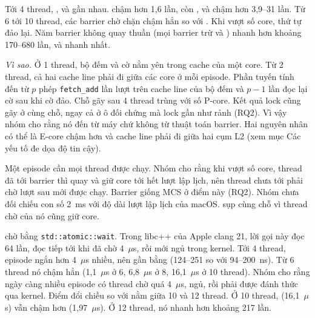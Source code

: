 Tới 4 thread, ,  và  gần nhau. 
chậm hơn  1,6 lần, còn ,  và  chậm
hơn 3,9--31 lần. Từ 6 tới 10 thread, các barrier chờ chặn chậm hẳn so với . Khi vượt số
core, thứ tự đảo lại. Năm barrier không quay thuần (mọi barrier trừ  và )
nhanh hơn  khoảng 170--680 lần, và  nhanh nhất.

\emph{Vì sao.} Ở 1 thread, bộ đếm và cờ nằm yên trong cache của một core. Từ 2 thread, cả hai cache
line phải đi giữa các core ở mỗi episode. Phần tuyến tính đến từ $p$ phép \texttt{fetch\_add} lần lượt
trên cache line của bộ đếm và $p-1$ lần đọc lại cờ sau khi cờ đảo. Chỗ gãy sau 4 thread trùng với số
P-core. Kết quả lock cũng gãy ở cùng chỗ, ngay cả ở ô đối chứng mà lock gần như rảnh (RQ2). Vì vậy nhóm
cho rằng nó đến từ máy chứ không từ thuật toán barrier. Hai nguyên nhân có thể là E-core chậm hơn và cache
line phải đi giữa hai cụm L2 (xem mục Các yếu tố đe dọa độ tin cậy).

Một episode cần mọi thread được chạy. Nhóm cho rằng khi vượt số core, thread đã tới barrier thì quay và
giữ core tới hết lượt lập lịch, nên thread chưa tới phải chờ lượt sau mới được chạy. Barrier giống MCS ở
điểm này (RQ2). Nhóm chưa đối chiếu con số 2~ms với độ dài lượt lập lịch của macOS.
 sụp cùng chỗ vì thread chờ của nó cũng giữ core.

 chờ bằng \texttt{std::atomic::wait}. Trong libc++ của Apple clang 21, lời gọi này đọc
64 lần, đọc tiếp tới khi đã chờ 4~$\mu$s, rồi mới ngủ trong kernel. Tới 4 thread, episode ngắn hơn
4~$\mu$s nhiều, nên  gần bằng  (124--251 so với 94--200~ns). Từ 6 thread nó
chậm hẳn (1,1~$\mu$s ở 6, 6,8~$\mu$s ở 8, 16,1~$\mu$s ở 10 thread). Nhóm cho rằng ngày càng nhiều episode
có thread chờ quá 4~$\mu$s, ngủ, rồi phải được đánh thức qua kernel. Điểm đổi chiều so với 
nằm giữa 10 và 12 thread. Ở 10 thread,  (16,1~$\mu$s) vẫn chậm hơn 
(1,97~$\mu$s). Ở 12 thread, nó nhanh hơn khoảng 217 lần.


